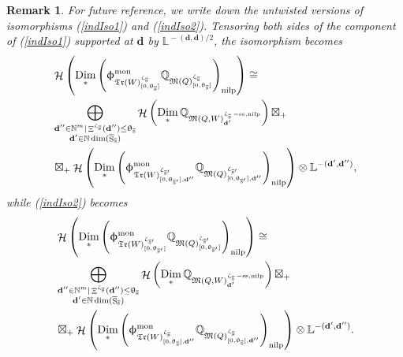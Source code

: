 \documentclass[a4paper,10pt]{amsart}
\newtheorem{remark}[theorem]{Remark}
\newcommand{\dd}{\mathbf{d}}
\newcommand{\LL}{\mathbb{L}}
\newcommand{\QQ}{\mathbb{Q}}
\DeclareMathOperator{\Simp}{S}
\newcommand{\WWW}{\mathfrak{Tr}(W)}
\newcommand{\Mst}{\mathfrak{M}}
\newcommand{\phim}[1]{\phi^{\mon}_{#1}}
\newcommand{\shave}{\overline{\Simp}_{\Ss}}
\renewcommand{\theta}{\uptheta}
\renewcommand{\zeta}{\upzeta}
\renewcommand{\phi}{\upphi}
\DeclareMathOperator{\sst}{-ss}
\DeclareMathOperator{\nilp}{nilp}
\DeclareMathOperator{\Dim}{Dim}
\DeclareMathOperator{\mon}{mon}
\DeclareMathOperator{\Mu}{\Upxi}
\DeclareMathOperator{\Ss}{\overline{s}}
\DeclareMathOperator{\Ho}{\mathcal{H}}
\begin{document}
\begin{remark}
\label{untwist}
For future reference, we write down the untwisted versions of isomorphisms (\ref{indIso1}) and (\ref{indIso2}).  Tensoring both sides of the component of (\ref{indIso1}) supported at $\dd$ by $\LL^{{}-(\dd,\dd)/2}$, the isomorphism becomes
\begin{align}
&\Ho\left(\Dim_* \left(\phim{\WWW^{\zeta_{\Ss}}_{[0,\theta_{\Ss}]}}\QQ_{\Mst(Q)_{[0,\theta_{\Ss}]}^{\zeta_{\Ss}}}\right)_{\nilp}\right)\cong \\
&\bigoplus_{\substack{\dd''\in\mathbb{N}^m|\Mu^{\zeta_{\Ss}}(\dd'')\leq \theta_{\Ss}\\ \dd'\in\mathbb{N}\dim(\shave)}}\Ho\left(\Dim_*\QQ_{\Mst(Q,W)_{\dd'}^{\zeta_{\Ss}\sst,\nilp}}\right)\boxtimes_+\nonumber\\
&\boxtimes_+\Ho\left(\Dim_* \left(\phim{\WWW_{[0,\theta_{\Ss'}],\dd''}^{\zeta_{\Ss'}} }\QQ_{\Mst(Q)_{[0,\theta_{\Ss'}],\dd''}^{\zeta_{\Ss'}} }\right)_{\nilp}\right)\otimes\LL^{{}-(\dd',\dd'')},\nonumber
\end{align}
while (\ref{indIso2}) becomes
\begin{align}
&\Ho\left(\Dim_* \left(\phim{\WWW_{[0,\theta_{\Ss'}]}^{\zeta_{\Ss'}} }\QQ_{\Mst(Q)_{[0,\theta_{\Ss'}]}^{\zeta_{\Ss'}} }\right)_{\nilp}\right)\cong \\
&\bigoplus_{\substack{\dd''\in\mathbb{N}^m|\Mu^{\zeta_{\Ss}}(\dd'')\leq \theta_{\Ss}\\ \dd'\in\mathbb{N}\dim(\shave)}}\Ho\left(\Dim_*\QQ_{\Mst(Q,W)_{\dd'}^{\zeta_{\Ss}\sst,\nilp}}\right)\boxtimes_+\nonumber\\
&\boxtimes_+\Ho\left(\Dim_* \left(\phim{\WWW^{\zeta_{\Ss}}_{[0,\theta_{\Ss}],\dd''}}\QQ_{\Mst(Q)_{[0,\theta_{\Ss}],\dd''}^{\zeta_{\Ss}}}\right)_{\nilp}\right)\otimes\LL^{{}-(\dd',\dd'')}.\nonumber
\end{align}
\end{remark}
\end{document}
